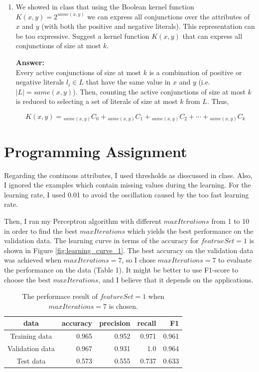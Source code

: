 \begin{enumerate}
{\bf Answer:}\\
When both classifiers converge, no more mistakes will be made in the case of the linearly separable dataset. In other words, the training error will be zero for both classifiers.

\item We showed in class that using the Boolean kernel function $K(x, y)=2^{same(x,y)}$ we can express all conjunctions over the attributes of $x$ and $y$ (with both the positive and negative literals). This representation can be too expressive. Suggest a kernel function $K(x, y)$ that can express all conjunctions of size at most $k$.

{\bf Answer:}\\
Every active conjunctions of size at most $k$ is a combination of positive or negative literals $l_i \in L$ that have the same value in $x$ and $y$ (i.e. $|L|=same(x,y)$). Then, counting the active conjunctions of size at most $k$ is reduced to selecting a set of literals of size at most $k$ from $L$. Thus,

\[
K(x, y)={}_{same(x,y)} C _0 + {}_{same(x,y)} C _1 + {}_{same(x,y)} C _2 + \cdots + {}_{same(x,y)} C _k
\]

\end{enumerate}

\section{Programming Assignment}

Regarding the continous attributes, I used thresholds as disscussed in class. Also, I ignored the examples which contain missing values during the learning. For the learning rate, I used 0.01 to avoid the oscillation caused by the too fast learning rate. 

Then, I ran my Perceptron algorithm with different $maxIterations$ from 1 to 10 in order to find the best $maxIterations$ which yields the best performance on the validation data. The learning curve in terms of the accuracy for $featrueSet = 1$  is shown in Figure \ref{fig:learning_curve_1}.  The best accuracy on the validation data was achieved when $maxIterations=7$, so I chose $maxIterations = 7$ to evaluate the performance on the data (Table 1). It might be better to use F1-score to choose the best $maxIterations$, and I believe that it depends on the applications.

\begin{table}[htb]
\centering
  \begin{tabular}{|c|r|r|r|r|} \hline
    data & accuracy & precision & recall & F1 \\ \hline
    Training data & 0.965 & 0.952 & 0.971 & 0.961 \\ \hline
    Validation data & 0.967 & 0.931 & 1.0 & 0.964 \\ \hline
    Test data & 0.573 & 0.555 & 0.737 & 0.633 \\ \hline
  \end{tabular}
  \caption{The performace result of $featureSet = 1$ when $maxIterations = 7$ is chosen.}
\end{table}

